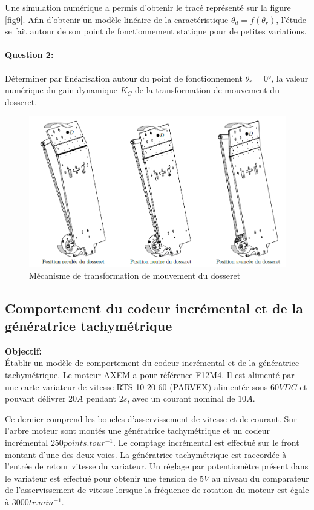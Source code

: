 Une simulation numérique a permis d'obtenir le tracé représenté sur la figure \ref{fig9}. Afin d'obtenir un modèle linéaire de la caractéristique $\theta_d=f(\theta_r)$, l'étude se fait autour de son point de fonctionnement statique pour de petites variations.

\paragraph{Question 2:} Déterminer par linéarisation autour du point de fonctionnement $\theta_r=0\text{°}$, la valeur numérique du gain dynamique $K_C$ de la transformation de mouvement du dosseret.

\begin{figure}[!ht]
\begin{center}
 \includegraphics[width=0.9\linewidth]{img/img08}
\end{center}
\caption{Mécanisme de transformation de mouvement du dosseret}
\label{fig7}
\end{figure}

\subsection{Comportement du codeur incrémental et de la génératrice tachymétrique}

\textbf{Objectif:}\\
Établir un modèle de comportement du codeur incrémental et de la génératrice tachymétrique.
Le moteur AXEM a pour référence F12M4. Il est alimenté par une carte variateur de vitesse RTS 10-20-60 (PARVEX) alimentée sous $60V DC$ et pouvant délivrer $20A$ pendant $2s$, avec un courant nominal de $10A$.

Ce dernier comprend les boucles d'asservissement de vitesse et de courant. Sur l'arbre moteur sont montés une génératrice tachymétrique et un codeur incrémental $250 points.tour^{-1}$. Le comptage incrémental est effectué sur le front montant d'une des deux voies. La génératrice tachymétrique est raccordée à l'entrée de retour vitesse du variateur. Un réglage par potentiomètre présent dans le variateur est effectué pour obtenir une tension de $5V$ au niveau du comparateur de l'asservissement de vitesse lorsque la fréquence de rotation du moteur est égale à $3000tr.min^{-1}$.

